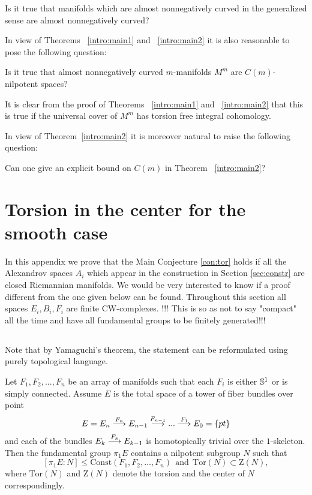 \documentclass{amsart}
\begin{document}
\begin{quest}
Is it true  that  manifolds which are almost nonnegatively curved in the generalized sense
are almost nonnegatively curved?
\end{quest}


In view of Theorems ~\ref{intro:main1} and ~\ref{intro:main2} it is
also reasonable to pose the following question:

\begin{quest}
Is it true that almost nonnegatively curved $m$-manifolds $M^m$
are $C(m)$-nilpotent spaces?
\end{quest}

It is clear from the proof of Theorems ~\ref{intro:main1} and ~\ref{intro:main2}
that this is true if the universal cover
of $M^m$ has torsion free integral cohomology.

In view of Theorem~\ref{intro:main2} it is moreover natural to raise
the following question:
\begin{quest}
Can one give an explicit bound on $C(m)$ in Theorem ~\ref{intro:main2}?
\end{quest}

\appendix
\section{Torsion in the center for the smooth case}

In this appendix we prove that the Main Conjecture \ref{con:tor} holds if all the Alexandrov spaces $A_i$ which appear in the construction in  Section \ref{sec:constr} are closed Riemannian manifolds.
We would be very interested to know if a proof different from the one given below can be found.
{\color{red} Throughout this section all spaces $E_i,B_i,F_i$ are finite CW-complexes. !!! This is so  as not to say "compact" all the time and have all fundamental groups to be finitely generated!!!}

\subsection{}
Note that by Yamaguchi's theorem, the statement can be reformulated using purely topological language.


\begin{thm}
Let $F_1,F_2,...,F_n$ be an array of manifolds 
such that each $F_i$ is either ${\Bbb S}^{1}$ or is simply connected. 
Assume $E$ is the total space of a tower of fiber bundles over point
$$E=E_n\buildrel {F_n}\over \longrightarrow E_{n-1}\buildrel {F_{n-1}}\over\longrightarrow...\buildrel {F_1}\over\longrightarrow E_0=\{pt\}$$
and each of the bundles $E_k\buildrel {F_k}\over \longrightarrow E_{k-1}$ is homotopically trivial over the $1$-skeleton. 
Then the fundamental group $\pi_1E$ contains a nilpotent subgroup $N$ such that
$$[\pi_1E:N]\le \mathrm{Const}(F_1,F_2,\dots,F_n)\ \ \text{and}\ \ \mathrm{Tor}(N)\subset \mathrm{Z}(N),$$
where $\mathrm{Tor}(N)$ and $\mathrm{Z}(N)$ denote the torsion and the center of $N$ correspondingly.
\end{thm}
\end{document}
